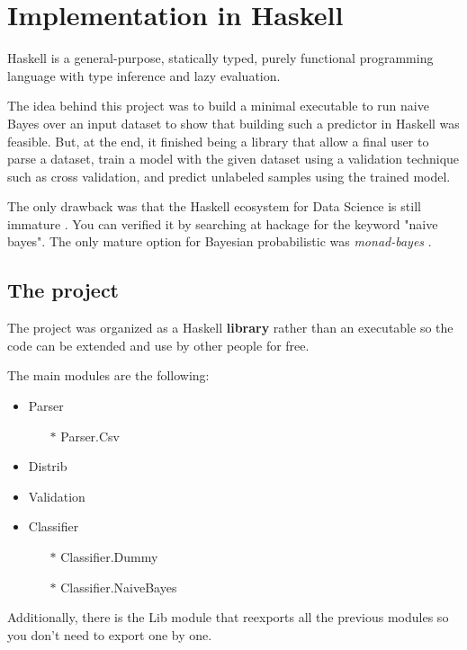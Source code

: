 \documentclass[12pt, a4paper]{article}
\begin{document}
\section{Implementation in Haskell} \label{implementation-in-haskell}

Haskell is a general-purpose, statically typed, purely functional programming language with type inference and lazy evaluation.

The idea behind this project was to build a minimal executable to run naive Bayes over an input dataset to show that building such a predictor
in Haskell was feasible. But, at the end, it finished being a library that allow a final user to parse a dataset, train a model with the given dataset using
a validation technique such as cross validation, and predict unlabeled samples using the trained model.

The only drawback was that the Haskell ecosystem for Data Science is still immature \cite{stateofhaskell}. You can verified it by searching at
hackage \cite{hackage} for the keyword "naive bayes". The only mature option for Bayesian probabilistic was \textit{monad-bayes} \cite{monad-bayes}.

\subsection{The project} \label{project-building}

The project was organized as a Haskell \textbf{library} rather than an executable so the code can be extended and use by other people for free.

The main modules are the following:

\begin{itemize} \label{modules-list}
  \item Parser
  \begin{itemize}
    \item[$\ast$] Parser.Csv
  \end{itemize}
  \item Distrib
  \item Validation
  \item Classifier
  \begin{itemize}
    \item[$\ast$] Classifier.Dummy
    \item[$\ast$] Classifier.NaiveBayes
  \end{itemize}
\end{itemize}

Additionally, there is the Lib module that reexports all the previous modules so you don't need to export one by one.
\end{document}
